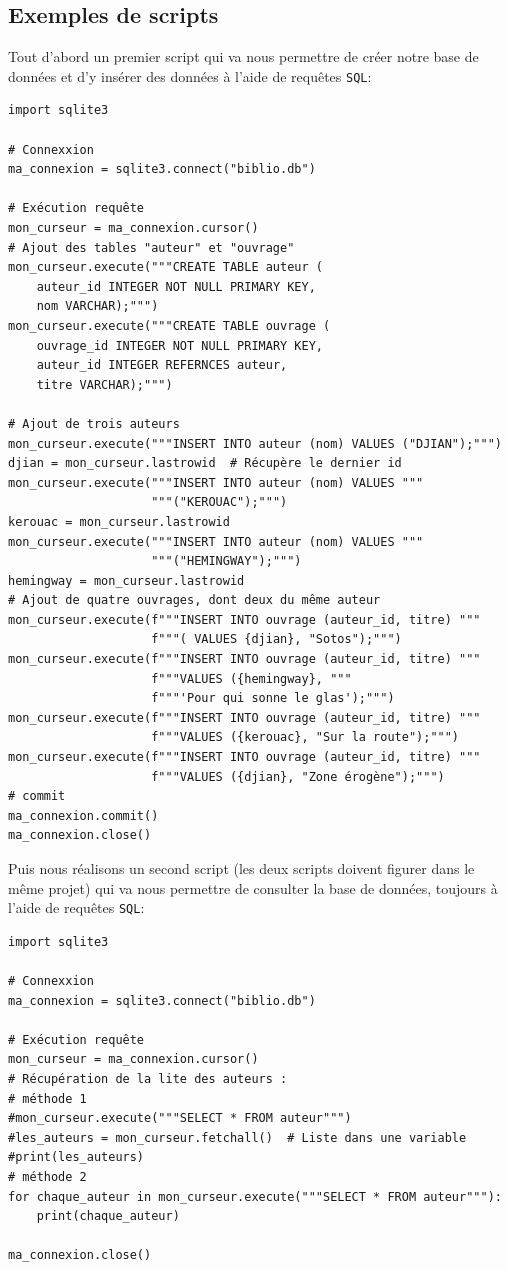 \documentclass[a4paper,11pt]{book}
\begin{document}
\subsection*{Exemples de scripts}
Tout d'abord un premier script qui va nous permettre de créer notre base de données et d'y insérer des données à l'aide de requêtes \texttt{SQL}:
\begin{lstlisting}
import sqlite3

# Connexxion
ma_connexion = sqlite3.connect("biblio.db")

# Exécution requête
mon_curseur = ma_connexion.cursor()
# Ajout des tables "auteur" et "ouvrage"
mon_curseur.execute("""CREATE TABLE auteur (
    auteur_id INTEGER NOT NULL PRIMARY KEY,
    nom VARCHAR);""")
mon_curseur.execute("""CREATE TABLE ouvrage (
    ouvrage_id INTEGER NOT NULL PRIMARY KEY,
    auteur_id INTEGER REFERNCES auteur,
    titre VARCHAR);""")

# Ajout de trois auteurs
mon_curseur.execute("""INSERT INTO auteur (nom) VALUES ("DJIAN");""")
djian = mon_curseur.lastrowid  # Récupère le dernier id
mon_curseur.execute("""INSERT INTO auteur (nom) VALUES """
                    """("KEROUAC");""")
kerouac = mon_curseur.lastrowid
mon_curseur.execute("""INSERT INTO auteur (nom) VALUES """
                    """("HEMINGWAY");""")
hemingway = mon_curseur.lastrowid
# Ajout de quatre ouvrages, dont deux du même auteur
mon_curseur.execute(f"""INSERT INTO ouvrage (auteur_id, titre) """
                    f"""( VALUES {djian}, "Sotos");""")
mon_curseur.execute(f"""INSERT INTO ouvrage (auteur_id, titre) """
                    f"""VALUES ({hemingway}, """
                    f"""'Pour qui sonne le glas');""")
mon_curseur.execute(f"""INSERT INTO ouvrage (auteur_id, titre) """ 
                    f"""VALUES ({kerouac}, "Sur la route");""")
mon_curseur.execute(f"""INSERT INTO ouvrage (auteur_id, titre) """
                    f"""VALUES ({djian}, "Zone érogène");""")
# commit
ma_connexion.commit()
ma_connexion.close()
\end{lstlisting}
\medskip

Puis nous réalisons un second script (les deux scripts doivent figurer dans le même projet) qui va nous permettre de consulter la base de données, toujours à l'aide de requêtes \texttt{SQL}:
\begin{lstlisting}
import sqlite3

# Connexxion
ma_connexion = sqlite3.connect("biblio.db")

# Exécution requête
mon_curseur = ma_connexion.cursor()
# Récupération de la lite des auteurs :
# méthode 1
#mon_curseur.execute("""SELECT * FROM auteur""")
#les_auteurs = mon_curseur.fetchall()  # Liste dans une variable
#print(les_auteurs)
# méthode 2
for chaque_auteur in mon_curseur.execute("""SELECT * FROM auteur"""):
    print(chaque_auteur)

ma_connexion.close()
\end{lstlisting}
\end{document}
